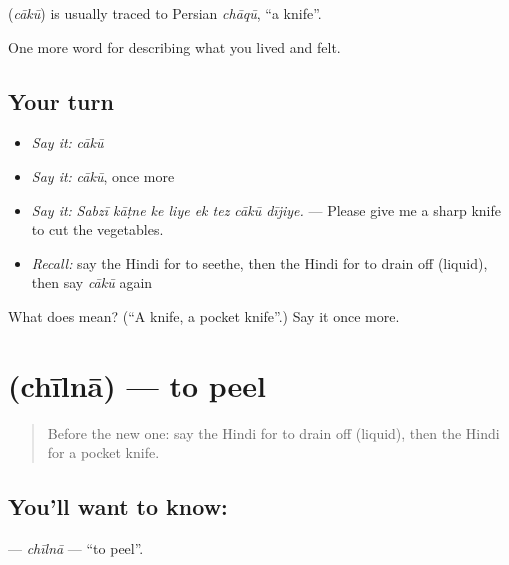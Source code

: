 \begin{cousinweb}
\textbf{} (\emph{cākū}) is usually traced to Persian \emph{chāqū}, \textquotedblleft{}a knife\textquotedblright{}.
\end{cousinweb}

\begin{grammarlens}[title={What you've built}]
One more word for describing what you lived and felt.
\end{grammarlens}

\subsection*{Your turn}
\begin{itemize}
\raggedright
  \item \emph{Say it:} \emph{cākū}
  \item \emph{Say it:} \emph{cākū}, once more
  \item \emph{Say it:} \emph{Sabzī kāṭne ke liye ek tez cākū dījiye.} — Please give me a sharp knife to cut the vegetables.
  \item \emph{Recall:} say the Hindi for to seethe, then the Hindi for to drain off (liquid), then say \emph{cākū} again
\end{itemize}

\begin{tcolorbox}[breakable,colback=teal!4,colframe=teal!35!black,title={Before you move on}]
What does  mean? (\textquotedblleft{}A knife, a pocket knife\textquotedblright{}.) Say it once more.
\end{tcolorbox}
\section[\texorpdfstring{\hi{छीलना} (chīlnā)}{छीलना (chīlnā)}]{ (chīlnā) — to peel}

\label{lesson:HI-C523-chiilna}



\begin{quote}
Before the new one: say the Hindi for to drain off (liquid), then the Hindi for a pocket knife.
\end{quote}

\subsection*{You'll want to know: }
\textbf{} — \emph{chīlnā} — \textquotedblleft{}to peel\textquotedblright{}.

